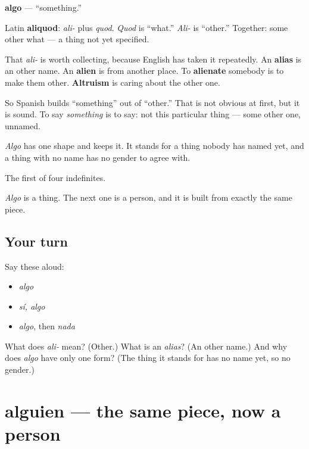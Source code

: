 \begin{cousinweb}
\textbf{algo} — \textquotedblleft{}something.\textquotedblright{}

Latin \textbf{aliquod}: \emph{ali-} plus \emph{quod}. \emph{Quod} is \textquotedblleft{}what.\textquotedblright{} \emph{Ali-} is \textquotedblleft{}other.\textquotedblright{} Together: some other what — a thing not yet specified.

That \emph{ali-} is worth collecting, because English has taken it repeatedly. An \textbf{alias} is an other name. An \textbf{alien} is from another place. To \textbf{alienate} somebody is to make them other. \textbf{Altruism} is caring about the other one.

So Spanish builds \textquotedblleft{}something\textquotedblright{} out of \textquotedblleft{}other.\textquotedblright{} That is not obvious at first, but it is sound. To say \emph{something} is to say: not this particular thing — some other one, unnamed.

\emph{Algo} has one shape and keeps it. It stands for a thing nobody has named yet, and a thing with no name has no gender to agree with.
\end{cousinweb}

\begin{grammarlens}[title={What you've built}]
The first of four indefinites.

\emph{Algo} is a thing. The next one is a person, and it is built from exactly the same piece.
\end{grammarlens}

\subsection*{Your turn}
Say these aloud:

\begin{itemize}
\raggedright
  \item \emph{algo}
  \item \emph{sí, algo}
  \item \emph{algo}, then \emph{nada}
\end{itemize}

\begin{tcolorbox}[breakable,colback=teal!4,colframe=teal!35!black,title={Before you move on}]
What does \emph{ali-} mean? (Other.) What is an \emph{alias}? (An other name.) And why does \emph{algo} have only one form? (The thing it stands for has no name yet, so no gender.)
\end{tcolorbox}
\section[alguien]{alguien — the same piece, now a person}

